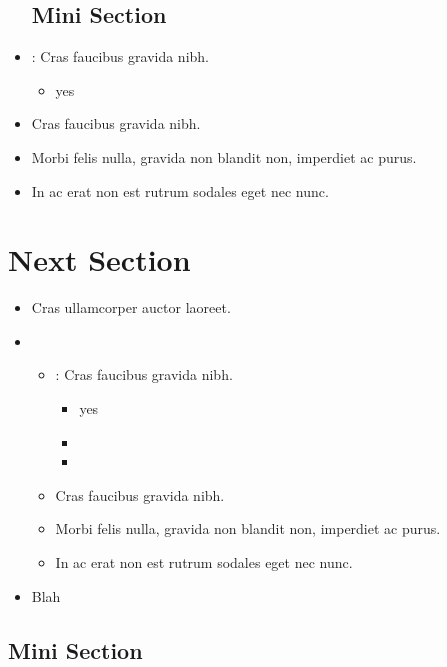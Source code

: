 \documentclass[12pt,a4paper]{report}
\begin{document}
\begin{itemize}
    \subsection{Mini Section}
        \item {}: Cras faucibus gravida nibh.
            \begin{itemize}
                \item yes
            \end{itemize}
        \item  Cras faucibus gravida nibh.
        \item  Morbi felis nulla, gravida non blandit non, imperdiet ac purus.
        \item  In ac erat non est rutrum sodales eget nec nunc.
\end{itemize}

\section{Next Section}
\begin{itemize}
        \item Cras ullamcorper auctor laoreet.
        \item 
    \begin{itemize}
    \subsection{Mini Section}\label{Mini Section1}
        \item {}: Cras faucibus gravida nibh.
            \begin{itemize}
                \item yes
                \item \neg \ggg
                \item 
            \end{itemize}
        \item  Cras faucibus gravida nibh.
        \item  Morbi felis nulla, gravida non blandit non, imperdiet ac purus.
        \item  In ac erat non est rutrum sodales eget nec nunc.
    \end{itemize}
    \item Blah
\end{itemize}

\subsection{Mini Section}
\end{document}

